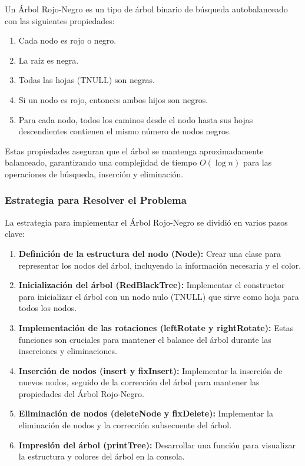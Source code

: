 \documentclass[12pt]{article}
\begin{document}
Un Árbol Rojo-Negro es un tipo de árbol binario de búsqueda autobalanceado con las siguientes propiedades:
\begin{enumerate}
    \item Cada nodo es rojo o negro.
    \item La raíz es negra.
    \item Todas las hojas (TNULL) son negras.
    \item Si un nodo es rojo, entonces ambos hijos son negros.
    \item Para cada nodo, todos los caminos desde el nodo hasta sus hojas descendientes contienen el mismo número de nodos negros.
\end{enumerate}

Estas propiedades aseguran que el árbol se mantenga aproximadamente balanceado, garantizando una complejidad de tiempo \(O(\log n)\) para las operaciones de búsqueda, inserción y eliminación.

\subsubsection{Estrategia para Resolver el Problema}

La estrategia para implementar el Árbol Rojo-Negro se dividió en varios pasos clave:
\begin{enumerate}
    \item \textbf{Definición de la estructura del nodo (Node):} Crear una clase para representar los nodos del árbol, incluyendo la información necesaria y el color.
    \item \textbf{Inicialización del árbol (RedBlackTree):} Implementar el constructor para inicializar el árbol con un nodo nulo (TNULL) que sirve como hoja para todos los nodos.
    \item \textbf{Implementación de las rotaciones (leftRotate y rightRotate):} Estas funciones son cruciales para mantener el balance del árbol durante las inserciones y eliminaciones.
    \item \textbf{Inserción de nodos (insert y fixInsert):} Implementar la inserción de nuevos nodos, seguido de la corrección del árbol para mantener las propiedades del Árbol Rojo-Negro.
    \item \textbf{Eliminación de nodos (deleteNode y fixDelete):} Implementar la eliminación de nodos y la corrección subsecuente del árbol.
    \item \textbf{Impresión del árbol (printTree):} Desarrollar una función para visualizar la estructura y colores del árbol en la consola.
\end{enumerate}
\end{document}
